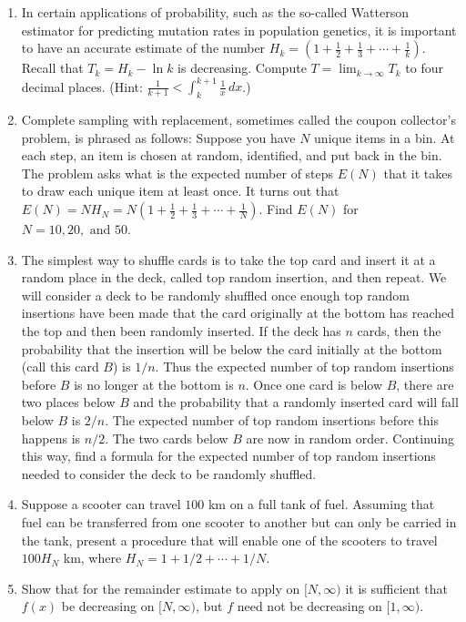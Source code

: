 \documentclass{exercises}
\begin{document}
\begin{enumerate}[resume]
\item In certain applications of probability, such as the so-called Watterson estimator for predicting mutation rates in population genetics, it is important to have an accurate estimate of the number $H_{k}=(1+\frac{1}{2}+\frac{1}{3}+\cdots+\frac{1}{k})$. Recall that $T_{k}=H_{k}-\ln k$ is decreasing. Compute $T=\lim_{k\to \infty}T_{k}$ to four decimal places. (Hint: $\frac{1}{k+1}<\int_{k}^{k+1}\frac{1}{x}\,dx$.)
\item \techrequired Complete sampling with replacement, sometimes called the coupon collector's problem, is phrased as follows: Suppose you have $N$ unique items in a bin. At each step, an item is chosen at random, identified, and put back in the bin. The problem asks what is the expected number of steps $E(N)$ that it takes to draw each unique item at least once. It turns out that $E(N)=NH_{N}=N(1+\frac{1}{2}+\frac{1}{3}+\cdots+\frac{1}{N})$. Find $E(N)$ for $N=10,20,\text{ and }50$.
\item \techrequired The simplest way to shuffle cards is to take the top card and insert it at a random place in the deck, called top random insertion, and then repeat. We will consider a deck to be randomly shuffled once enough top random insertions have been made that the card originally at the bottom has reached the top and then been randomly inserted. If the deck has $n$ cards, then the probability that the insertion will be below the card initially at the bottom (call this card $B$) is $1/n$. Thus the expected number of top random insertions before $B$ is no longer at the bottom is $n$. Once one card is below $B$, there are two places below $B$ and the probability that a randomly inserted card will fall below $B$ is $2/n$. The expected number of top random insertions before this happens is $n/2$. The two cards below $B$ are now in random order. Continuing this way, find a formula for the expected number of top random insertions needed to consider the deck to be randomly shuffled.
\item Suppose a scooter can travel $100$ km on a full tank of fuel. Assuming that fuel can be transferred from one scooter to another but can only be carried in the tank, present a procedure that will enable one of the scooters to travel $100H_{N}$ km, where $H_{N}=1+1/2+\cdots+1/N$.
\item Show that for the remainder estimate to apply on $[N,\infty)$ it is sufficient that $f(x)$ be decreasing on $[N,\infty)$, but $f$ need not be decreasing on $[1,\infty)$.

\end{enumerate}
\end{document}
